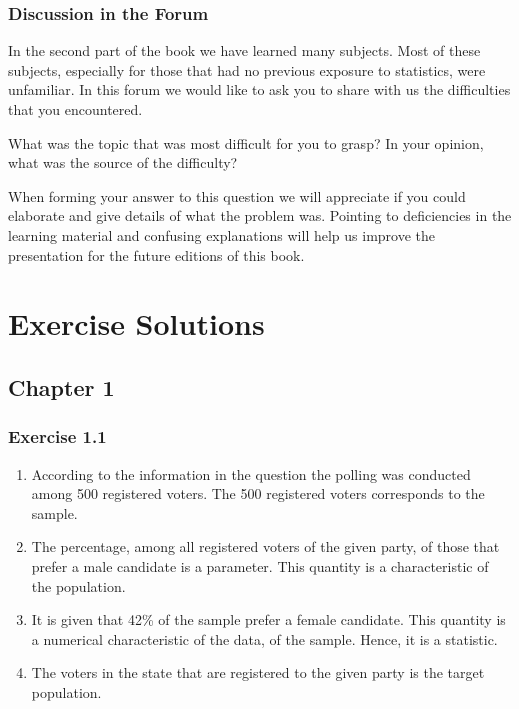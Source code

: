 \documentclass[
]{krantz}
\theoremstyle{definition}
\theoremstyle{definition}
\theoremstyle{definition}
\theoremstyle{remark}
\begin{document}
\hypertarget{discussion-in-the-forum-1}{%
\subsection{Discussion in the Forum}\label{discussion-in-the-forum-1}}

In the second part of the book we have learned many subjects. Most of
these subjects, especially for those that had no previous exposure to
statistics, were unfamiliar. In this forum we would like to ask you to
share with us the difficulties that you encountered.

What was the topic that was most difficult for you to grasp? In your
opinion, what was the source of the difficulty?

When forming your answer to this question we will appreciate if you
could elaborate and give details of what the problem was. Pointing to
deficiencies in the learning material and confusing explanations will
help us improve the presentation for the future editions of this book.

\hypertarget{exercise-solutions}{%
\chapter*{Exercise Solutions}\label{exercise-solutions}}


\hypertarget{chapter-1}{%
\section*{Chapter 1}\label{chapter-1}}


\hypertarget{exercise-1.1}{%
\subsection*{Exercise 1.1}\label{exercise-1.1}}


\begin{enumerate}
\def\labelenumi{\arabic{enumi}.}
\item
  According to the information in the question the polling was conducted among 500 registered voters. The 500 registered voters corresponds to the sample.
\item
  The percentage, among all registered voters of the given party, of those that prefer a male candidate is a parameter. This quantity is a characteristic of the population.
\item
  It is given that 42\% of the sample prefer a female candidate. This quantity is a numerical characteristic of the data, of the sample. Hence, it is a statistic.
\item
  The voters in the state that are
  registered to the given party is the target population.
\end{enumerate}
\end{document}
